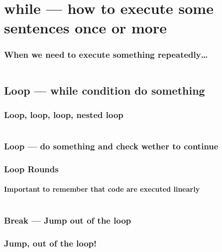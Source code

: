 \documentclass[en, 11pt, xcolor=dvipsnames]{beamer}
\begin{document}

\section{while --- how to execute some sentences once or more}
\begin{frame}[fragile]
	\frametitle{When we need to execute something repeatedly\dots}

	\begin{columns}[c]
		\begin{column}{0.9\textwidth}


		\end{column}
	\end{columns}

\end{frame}

\subsection{Loop --- while condition do something}
\begin{frame}[fragile]
	\frametitle{Loop, loop, loop, nested loop}

	\begin{columns}[c]
		\begin{column}{0.9\textwidth}


		\end{column}
	\end{columns}

\end{frame}

\subsubsection{Loop --- do something and check wether to continue}
\begin{frame}[fragile]
	\frametitle{Loop Rounds}
	\framesubtitle{Important to remember that code are executed linearly}

	\begin{columns}[c]
		\begin{column}{0.9\textwidth}


		\end{column}
	\end{columns}

\end{frame}

\subsubsection{Break --- Jump out of the loop}
\begin{frame}[fragile]
	\frametitle{Jump, out of the loop!}

	\begin{columns}[c]
		\begin{column}{0.9\textwidth}


		\end{column}
	\end{columns}

\end{frame}
\end{document}
